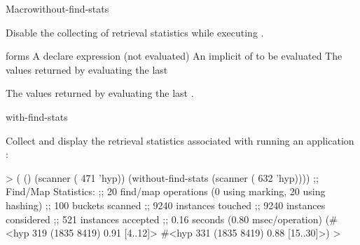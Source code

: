 \documentclass[10pt,twoside,english,pdftex]{article}
\begin{document}

\begin{functiondoc}{Macro}{without-find-stats}%
  {\superstar{}
    \superstar{}
    \returns{} \superstar} 
%
%
%
  
\fnsyntax

\fnpurpose 
{}%
%
Disable the collecting of retrieval statistics while executing .

\fnpackage {}

\fnmodule {}

\fnargs
\begin{args}{forms}
\arg[declaration] A declare expression (not evaluated)
\arg[forms] An implicit  of  to be evaluated
\arg[results] The values returned by evaluating the last 
\end{args}

\fnreturns The values returned by evaluating the last .

\begin{alsos}{with-find-stats}
\end{alsos}

\fnexample
{}%
%
Collect and display the retrieval statistics associated with
running an application  :
%
\W\supp
\begin{example}
> ( ()
     (scanner ( 471 'hyp))
     (without-find-stats
        (scanner ( 632 'hyp))))
  ;; Find/Map Statistics:
  ;;        20 find/map operations (0 using marking, 20 using hashing)
  ;;       100 buckets scanned
  ;;      9240 instances touched
  ;;      9240 instances considered
  ;;       521 instances accepted
  ;;      0.16 seconds (0.80 msec/operation)
  (#<hyp 319 (1835 8419) 0.91 [4..12]>
   #<hyp 331 (1835 8419) 0.88 [15..30]>)
  >
\end{example}

\end{functiondoc}

\end{document}
